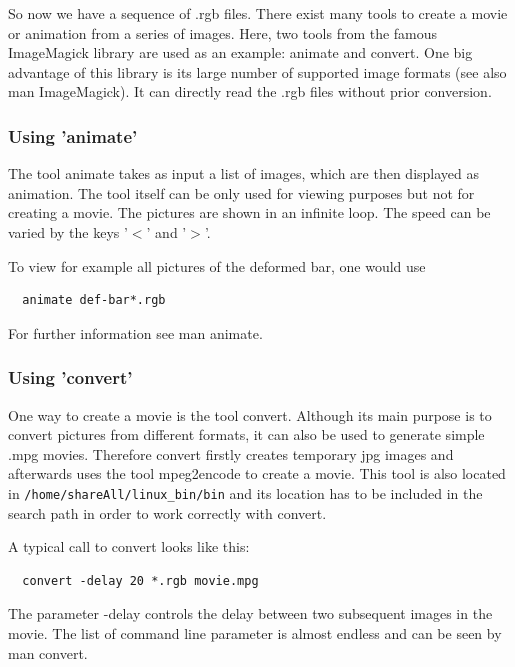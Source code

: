 So now we  have a sequence of .rgb  files. There exist many tools  to create a
movie or  animation from a series of  images. Here, two tools  from the famous
ImageMagick  library are  used as  an example:  animate and  convert.  One big
advantage of this library is its  large number of supported image formats (see
also  man ImageMagick).  It can  directly read  the .rgb  files  without prior
conversion.

\subsubsection{Using 'animate'}

The tool animate takes as input a  list of images, which are then displayed as
animation. The tool  itself can be only used for viewing  purposes but not for
creating a movie. The pictures are shown in an infinite loop. The speed can be
varied by the keys '$<$' and '$>$'.

To view for example all pictures of the deformed bar, one would use

\begin{verbatim}
  animate def-bar*.rgb
\end{verbatim}

For further information see man animate.

\subsubsection{Using 'convert'}

One way to create a movie is the tool convert. Although its main purpose is to
convert  pictures from  different formats,  it can  also be  used to  generate
simple .mpg movies. Therefore convert firstly creates temporary jpg images and
afterwards uses  the tool mpeg2encode  to create a  movie.  This tool  is also
located in  \texttt{/home/shareAll/linux\_bin/bin} and its location  has to be
included in the search path in order to work correctly with convert.

\noindent A typical call to convert looks like this:

\begin{verbatim}
  convert -delay 20 *.rgb movie.mpg
\end{verbatim}

\noindent  The parameter  -delay  controls the  delay  between two  subsequent
images in the movie. The list  of command line parameter is almost endless and
can be seen by man convert.


